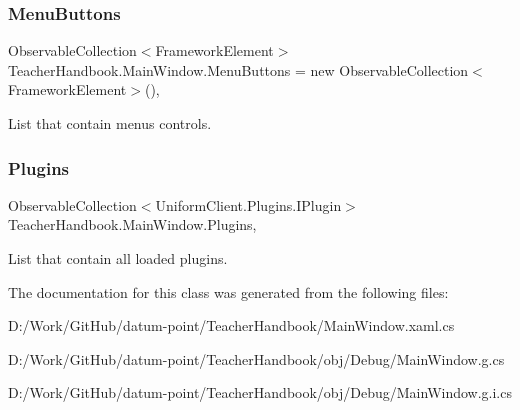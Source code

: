 \subsubsection{\texorpdfstring{Menu\+Buttons}{MenuButtons}}
{\footnotesize\ttfamily Observable\+Collection$<$Framework\+Element$>$ Teacher\+Handbook.\+Main\+Window.\+Menu\+Buttons = new Observable\+Collection$<$Framework\+Element$>$()\hspace{0.3cm}{\ttfamily [get]}, {\ttfamily [set]}}



List that contain menu\textquotesingle{}s controls. 

\mbox{\label{class_teacher_handbook_1_1_main_window_a86e1ee1d12e39fbbd0bc0d7f32e36ad0}} 
\subsubsection{\texorpdfstring{Plugins}{Plugins}}
{\footnotesize\ttfamily Observable\+Collection$<$Uniform\+Client.\+Plugins.\+I\+Plugin$>$ Teacher\+Handbook.\+Main\+Window.\+Plugins\hspace{0.3cm}{\ttfamily [get]}, {\ttfamily [set]}}



List that contain all loaded plugins. 



The documentation for this class was generated from the following files\+:\begin{DoxyCompactItemize}
\item 
D\+:/\+Work/\+Git\+Hub/datum-\/point/\+Teacher\+Handbook/Main\+Window.\+xaml.\+cs\item 
D\+:/\+Work/\+Git\+Hub/datum-\/point/\+Teacher\+Handbook/obj/\+Debug/Main\+Window.\+g.\+cs\item 
D\+:/\+Work/\+Git\+Hub/datum-\/point/\+Teacher\+Handbook/obj/\+Debug/Main\+Window.\+g.\+i.\+cs\end{DoxyCompactItemize}
